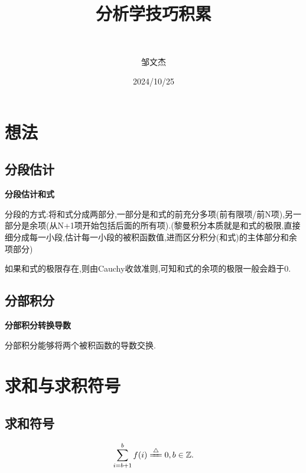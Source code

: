 \documentclass[lang=cn,newtx,10pt,scheme=chinese]{elegantbook}
\title{分析学技巧积累}
\subtitle{\,\,}
\author{邹文杰}
\institute{无}
\date{2024/10/25}
\begin{document}
\maketitle
\frontmatter

\tableofcontents

\mainmatter
\everymath{\displaystyle} %

\chapter{想法}

\section{分段估计}

\begin{conclusion}
\textbf{分段估计和式}

分段的方式:将和式分成两部分,一部分是和式的前充分多项(前有限项/前N项),另一部分是余项(从N+1项开始包括后面的所有项).(黎曼积分本质就是和式的极限,直接细分成每一小段,估计每一小段的被积函数值,进而区分积分(和式)的主体部分和余项部分)
\end{conclusion}
\begin{note}
如果和式的极限存在,则由Cauchy收敛准则,可知和式的余项的极限一般会趋于0.
\end{note}

\section{分部积分}
\textbf{分部积分转换导数}

分部积分能够将两个被积函数的导数交换.



\chapter{求和与求积符号}

\section{求和符号}

\begin{definition}\label{definition:空和(Empty sum)}
\begin{align}
\sum\limits_{i=b+1}^b{f(i)}\xlongequal{\bigtriangleup}0,b\in \mathbb{Z}.
\end{align}
\end{definition}
\end{document}
